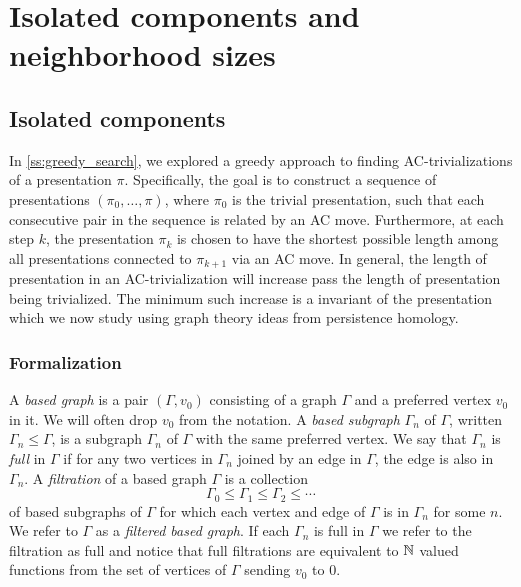 
\section{Isolated components and neighborhood sizes}\label{sec:isolated}

\subsection{Isolated components}

In \autoref{ss:greedy_search}, we explored a greedy approach to finding AC-trivializations of a presentation \(\pi\). Specifically, the goal is to construct a sequence of presentations \((\pi_0, \dots, \pi)\), where \(\pi_0\) is the trivial presentation, such that each consecutive pair in the sequence is related by an AC move. Furthermore, at each step \(k\), the presentation \(\pi_k\) is chosen to have the shortest possible length among all presentations connected to \(\pi_{k+1}\) via an AC move.
In general, the length of presentation in an AC-trivialization will increase pass the length of presentation being trivialized.
The minimum such increase is a invariant of the presentation which we now study using graph theory ideas from persistence homology.


\subsubsection{Formalization}

A \textit{based graph} is a pair $(\Gamma, v_0)$ consisting of a graph $\Gamma$ and a preferred vertex $v_0$ in it.
We will often drop $v_0$ from the notation.
A \textit{based subgraph} $\Gamma_n$ of $\Gamma$, written $\Gamma_n \leq \Gamma$, is a subgraph $\Gamma_n$ of $\Gamma$ with the same preferred vertex.
We say that $\Gamma_n$ is \textit{full} in $\Gamma$ if for any two vertices in $\Gamma_n$ joined by an edge in $\Gamma$, the edge is also in $\Gamma_n$.
A \textit{filtration} of a based graph $\Gamma$ is a collection
\[
\Gamma_0 \leq \Gamma_1 \leq \Gamma_2 \leq \dotsb
\]
of based subgraphs of $\Gamma$ for which each vertex and edge of $\Gamma$ is in $\Gamma_n$ for some $n$.
We refer to $\Gamma$ as a \textit{filtered based graph}.
If each $\Gamma_n$ is full in $\Gamma$ we refer to the filtration as full and notice that full filtrations are equivalent to $\mathbb{N}$ valued functions from the set of vertices of $\Gamma$ sending $v_0$ to $0$.

